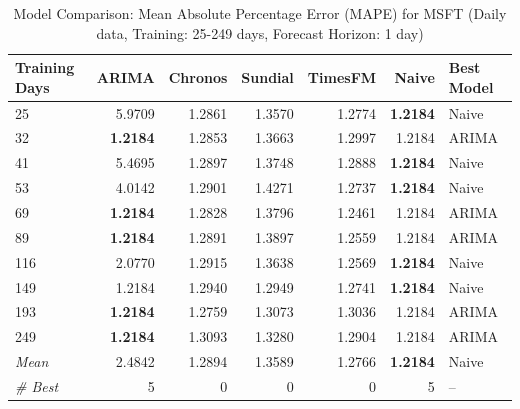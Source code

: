 \begin{table}[htbp]
\centering
\caption{Model Comparison: Mean Absolute Percentage Error (MAPE) for MSFT (Daily data, Training: 25-249 days, Forecast Horizon: 1 day)}
\label{tab:comparison_MSFT_1d_train-less-year-log_h1_MAPE}
\small
\begin{tabular}{lrrrrrl}
\toprule
Training Days & ARIMA & Chronos & Sundial & TimesFM & Naive & Best Model \\
\midrule
25 & 5.9709 & 1.2861 & 1.3570 & 1.2774 & \textbf{1.2184} & Naive \\
32 & \textbf{1.2184} & 1.2853 & 1.3663 & 1.2997 & 1.2184 & ARIMA \\
41 & 5.4695 & 1.2897 & 1.3748 & 1.2888 & \textbf{1.2184} & Naive \\
53 & 4.0142 & 1.2901 & 1.4271 & 1.2737 & \textbf{1.2184} & Naive \\
69 & \textbf{1.2184} & 1.2828 & 1.3796 & 1.2461 & 1.2184 & ARIMA \\
89 & \textbf{1.2184} & 1.2891 & 1.3897 & 1.2559 & 1.2184 & ARIMA \\
116 & 2.0770 & 1.2915 & 1.3638 & 1.2569 & \textbf{1.2184} & Naive \\
149 & 1.2184 & 1.2940 & 1.2949 & 1.2741 & \textbf{1.2184} & Naive \\
193 & \textbf{1.2184} & 1.2759 & 1.3073 & 1.3036 & 1.2184 & ARIMA \\
249 & \textbf{1.2184} & 1.3093 & 1.3280 & 1.2904 & 1.2184 & ARIMA \\
\midrule
\textit{Mean} & 2.4842 & 1.2894 & 1.3589 & 1.2766 & \textbf{1.2184} & Naive \\
\textit{\# Best} & 5 & 0 & 0 & 0 & 5 & -- \\
\bottomrule
\end{tabular}
\end{table}